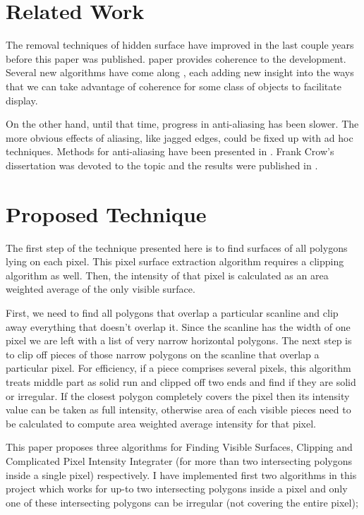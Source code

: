 \documentclass{acmsiggraph}               %
\begin{document}
\section{Related Work}
\label{sec:related_work}


The removal techniques of hidden surface have improved in the last couple years before this paper was published. \cite{7} paper provides coherence to the development. Several new algorithms have come along \cite{3}\cite{8}\cite{9}, each adding new insight into the ways that we can take advantage of coherence for some class of objects to facilitate display. 

On the other hand, until that time, progress in anti-aliasing has been slower. The more obvious effects of aliasing, like jagged edges, could be fixed up with ad hoc techniques. Methods for anti-aliasing have been presented in \cite{1}\cite{2}\cite{4}. Frank Crow's dissertation was devoted to the topic and the results were published in \cite{2}. 


\section{Proposed Technique}
\label{sec:Proposed_Technique}

The first step of the technique presented here is to find surfaces of all polygons lying on each pixel. This pixel surface extraction algorithm requires a clipping algorithm as well. Then, the intensity of that pixel is calculated as an area weighted average of the only visible surface.

First, we need to find all polygons that overlap a particular scanline and clip away everything that doesn't overlap it. Since the scanline has the width of one pixel we are left with a list of very narrow horizontal polygons. The next step is to clip off pieces of those narrow polygons on the scanline that overlap a particular pixel. For efficiency, if a piece comprises several pixels, this algorithm treats middle part as solid run and clipped off two ends and find if they are solid or irregular. If the closest polygon completely covers the pixel then its intensity value can be taken as full intensity, otherwise area of each visible pieces need to be calculated to compute area weighted average intensity for that pixel.

This paper proposes three algorithms for Finding Visible Surfaces, Clipping and 
Complicated Pixel Intensity Integrater (for more than two intersecting polygons 
inside a single pixel) respectively. I have implemented first two algorithms in 
this project which works for up-to two intersecting polygons inside a pixel and 
only one of these intersecting polygons can be irregular (not covering the entire 
pixel);
\end{document}
